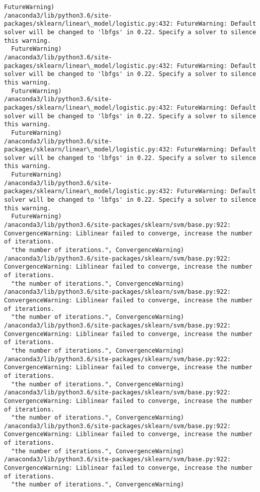 \documentclass[11pt]{article}
\begin{document}
\begin{Verbatim}[commandchars=\\\{\}]
  FutureWarning)
/anaconda3/lib/python3.6/site-packages/sklearn/linear\_model/logistic.py:432: FutureWarning: Default solver will be changed to 'lbfgs' in 0.22. Specify a solver to silence this warning.
  FutureWarning)
/anaconda3/lib/python3.6/site-packages/sklearn/linear\_model/logistic.py:432: FutureWarning: Default solver will be changed to 'lbfgs' in 0.22. Specify a solver to silence this warning.
  FutureWarning)
/anaconda3/lib/python3.6/site-packages/sklearn/linear\_model/logistic.py:432: FutureWarning: Default solver will be changed to 'lbfgs' in 0.22. Specify a solver to silence this warning.
  FutureWarning)
/anaconda3/lib/python3.6/site-packages/sklearn/linear\_model/logistic.py:432: FutureWarning: Default solver will be changed to 'lbfgs' in 0.22. Specify a solver to silence this warning.
  FutureWarning)
/anaconda3/lib/python3.6/site-packages/sklearn/linear\_model/logistic.py:432: FutureWarning: Default solver will be changed to 'lbfgs' in 0.22. Specify a solver to silence this warning.
  FutureWarning)
/anaconda3/lib/python3.6/site-packages/sklearn/svm/base.py:922: ConvergenceWarning: Liblinear failed to converge, increase the number of iterations.
  "the number of iterations.", ConvergenceWarning)
/anaconda3/lib/python3.6/site-packages/sklearn/svm/base.py:922: ConvergenceWarning: Liblinear failed to converge, increase the number of iterations.
  "the number of iterations.", ConvergenceWarning)
/anaconda3/lib/python3.6/site-packages/sklearn/svm/base.py:922: ConvergenceWarning: Liblinear failed to converge, increase the number of iterations.
  "the number of iterations.", ConvergenceWarning)
/anaconda3/lib/python3.6/site-packages/sklearn/svm/base.py:922: ConvergenceWarning: Liblinear failed to converge, increase the number of iterations.
  "the number of iterations.", ConvergenceWarning)
/anaconda3/lib/python3.6/site-packages/sklearn/svm/base.py:922: ConvergenceWarning: Liblinear failed to converge, increase the number of iterations.
  "the number of iterations.", ConvergenceWarning)
/anaconda3/lib/python3.6/site-packages/sklearn/svm/base.py:922: ConvergenceWarning: Liblinear failed to converge, increase the number of iterations.
  "the number of iterations.", ConvergenceWarning)
/anaconda3/lib/python3.6/site-packages/sklearn/svm/base.py:922: ConvergenceWarning: Liblinear failed to converge, increase the number of iterations.
  "the number of iterations.", ConvergenceWarning)
/anaconda3/lib/python3.6/site-packages/sklearn/svm/base.py:922: ConvergenceWarning: Liblinear failed to converge, increase the number of iterations.
  "the number of iterations.", ConvergenceWarning)

\end{Verbatim}
\end{document}
